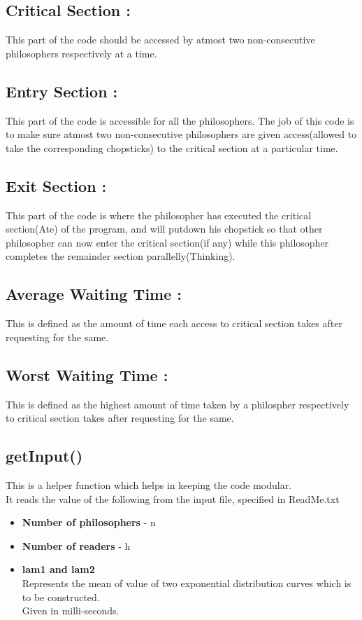 \documentclass[12pt]{article}
\begin{document}
\subsection{Critical Section :}
This part of the code should be accessed by atmost two non-consecutive philosophers respectively at a time.
\subsection{Entry Section :}
This part of the code is accessible for all the philosophers. The job of this code is to make sure atmost two non-consecutive philosophers are given access(allowed to take the corresponding chopsticks) to the critical section at a particular time.
\subsection{Exit Section :}
This part of the code is where the philosopher has executed the critical section(Ate) of the program, and will putdown his chopstick so that other philosopher can now enter the critical section(if any) while this philosopher completes the remainder section parallelly(Thinking).
\subsection{Average Waiting Time :}
This is defined as the amount of time each access to critical section takes after requesting for the same.
\subsection{Worst Waiting Time :}
This is defined as the highest amount of time taken by a philospher respectively to critical section takes after requesting for the same.
\subsection{getInput()}
This is a helper function which helps in keeping the code modular.\\
It reads the value of the following from the input file, specified in ReadMe.txt \\
\begin{itemize}
\item \textbf{Number of philosophers} - n
\item \textbf{Number of readers} - h\\
\item \textbf{lam1 and lam2}\\
Represents the mean of value of two exponential distribution curves which is to be constructed.\\
Given in milli-seconds.
\end{itemize}
\end{document}
